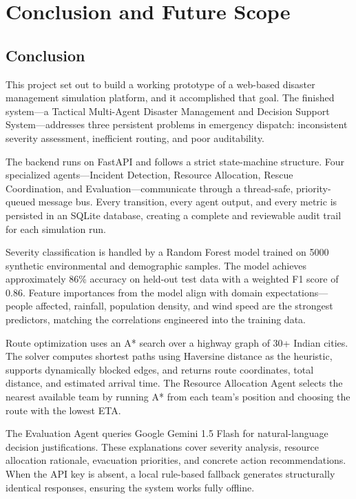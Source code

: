 \chapter{Conclusion and Future Scope}
\label{ch:conclusion}

\section{Conclusion}
\label{sec:conclusion}

This project set out to build a working prototype of a web-based disaster management simulation platform, and it accomplished that goal. The finished system---a Tactical Multi-Agent Disaster Management and Decision Support System---addresses three persistent problems in emergency dispatch: inconsistent severity assessment, inefficient routing, and poor auditability.

The backend runs on FastAPI and follows a strict state-machine structure. Four specialized agents---Incident Detection, Resource Allocation, Rescue Coordination, and Evaluation---communicate through a thread-safe, priority-queued message bus. Every transition, every agent output, and every metric is persisted in an SQLite database, creating a complete and reviewable audit trail for each simulation run.

Severity classification is handled by a Random Forest model trained on 5000 synthetic environmental and demographic samples. The model achieves approximately 86\% accuracy on held-out test data with a weighted F1 score of 0.86. Feature importances from the model align with domain expectations---people affected, rainfall, population density, and wind speed are the strongest predictors, matching the correlations engineered into the training data.

Route optimization uses an A* search over a highway graph of 30+ Indian cities. The solver computes shortest paths using Haversine distance as the heuristic, supports dynamically blocked edges, and returns route coordinates, total distance, and estimated arrival time. The Resource Allocation Agent selects the nearest available team by running A* from each team's position and choosing the route with the lowest ETA.

The Evaluation Agent queries Google Gemini 1.5 Flash for natural-language decision justifications. These explanations cover severity analysis, resource allocation rationale, evacuation priorities, and concrete action recommendations. When the API key is absent, a local rule-based fallback generates structurally identical responses, ensuring the system works fully offline.

